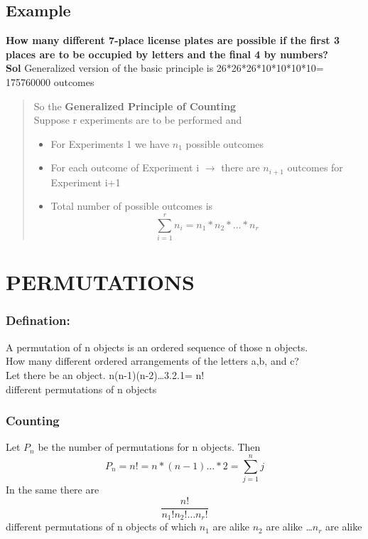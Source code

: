 \documentclass{article}
\begin{document}
\subsection*{Example}
\textbf{How many different 7-place license plates are possible if the first 3 places are to be occupied by letters and the final 4 by numbers?}\\
\textbf{Sol} Generalized version of the basic principle is 26*26*26*10*10*10*10= 175760000 outcomes
\begin{abstract}
    So the \textbf{Generalized Principle of Counting}\\
    Suppose r experiments are to be performed and 
    \begin{itemize}
        \item For Experiments 1 we have $n_{1}$ possible outcomes
        \item For each outcome of Experiment i $\xrightarrow{}$  there are $n_{i+1}$ outcomes for Experiment i+1
        \item Total number of possible outcomes is 
        \begin{equation}
            \sum_{i=1}^{r} n_{i}= n_{1}*n_{2}*\ldots*n_{r}
        \end{equation}
    \end{itemize}
    
\end{abstract}
\section{PERMUTATIONS}
\subsubsection{Defination:}
A permutation of n objects is an ordered sequence of those n objects.\\
How many different ordered arrangements of the letters a,b, and c? \\
Let there be an object. n(n-1)(n-2)\ldots 3.2.1= n!\\ different permutations of n objects
\subsubsection{Counting}
Let $P_{n}$ be the number of permutations for n objects. Then 
\begin{equation}
    P_{n}= n!= n*(n-1)\ldots*2= \sum_{j=1}^{n}j
\end{equation}
In the same there are 
\begin{equation}
    \frac{n!}{n_{1}!n_{2}!\ldots n_{r}!}
\end{equation}
different permutations of n objects of which $n_{1}$ are alike $n_{2}$ are alike \ldots $n_{r}$ are alike
\end{document}
